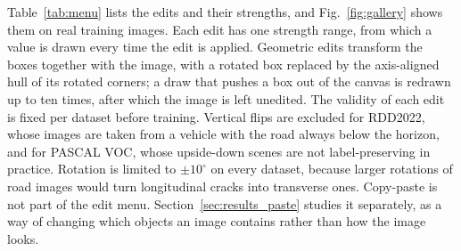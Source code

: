 \documentclass[conference]{IEEEtran}
\begin{document}
Table~\ref{tab:menu} lists the edits and their strengths, and Fig.~\ref{fig:gallery} shows them on real training images. Each edit has one strength range, from which a value is drawn every time the edit is applied. Geometric edits transform the boxes together with the image, with a rotated box replaced by the axis-aligned hull of its rotated corners; a draw that pushes a box out of the canvas is redrawn up to ten times, after which the image is left unedited. The validity of each edit is fixed per dataset before training. Vertical flips are excluded for RDD2022, whose images are taken from a vehicle with the road always below the horizon, and for PASCAL VOC, whose upside-down scenes are not label-preserving in practice. Rotation is limited to $\pm10^\circ$ on every dataset, because larger rotations of road images would turn longitudinal cracks into transverse ones. Copy-paste is not part of the edit menu. Section~\ref{sec:results_paste} studies it separately, as a way of changing which objects an image contains rather than how the image looks.
\end{document}
